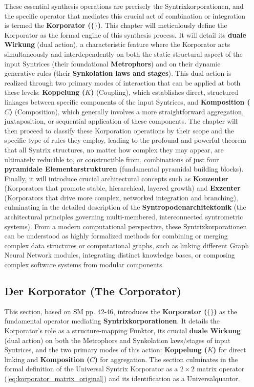 \documentclass[12pt]{article}
\begin{document}
These essential synthesis operations are precisely the Syntrixkorporationen, and the specific operator that mediates this crucial act of combination or integration is termed the \textbf{Korporator (\( \{ \} \))}. This chapter will meticulously define the Korporator as the formal engine of this synthesis process. It will detail its \textbf{duale Wirkung} (dual action), a characteristic feature where the Korporator acts simultaneously and interdependently on both the static structural aspect of the input Syntrices (their foundational \textbf{Metrophors}) and on their dynamic generative rules (their \textbf{Synkolation laws and stages}). This dual action is realized through two primary modes of interaction that can be applied at both these levels: \textbf{Koppelung (\( K \))} (Coupling), which establishes direct, structured linkages between specific components of the input Syntrices, and \textbf{Komposition (\( C \))} (Composition), which generally involves a more straightforward aggregation, juxtaposition, or sequential application of these components. The chapter will then proceed to classify these Korporation operations by their scope and the specific type of rules they employ, leading to the profound and powerful theorem that all Syntrix structures, no matter how complex they may appear, are ultimately reducible to, or constructible from, combinations of just four \textbf{pyramidale Elementarstrukturen} (fundamental pyramidal building blocks). Finally, it will introduce crucial architectural concepts such as \textbf{Konzenter} (Korporators that promote stable, hierarchical, layered growth) and \textbf{Exzenter} (Korporators that drive more complex, networked integration and branching), culminating in the detailed description of the \textbf{Syntropodenarchitektonik} (the architectural principles governing multi-membered, interconnected syntrometric systems). From a modern computational perspective, these Syntrixkorporationen can be understood as highly formalized methods for combining or merging complex data structures or computational graphs, such as linking different Graph Neural Network modules, integrating distinct knowledge bases, or composing complex software systems from modular components.

\subsection{Der Korporator (The Corporator)}
\label{sec:korporator}

This section, based on SM pp. 42-46, introduces the \textbf{Korporator (\( \{ \} \))} as the fundamental operator mediating \textbf{Syntrixkorporationen}. It details the Korporator's role as a structure-mapping Funktor, its crucial \textbf{duale Wirkung} (dual action) on both the Metrophors and Synkolation laws/stages of input Syntrices, and the two primary modes of this action: \textbf{Koppelung (\(K\))} for direct linking and \textbf{Komposition (\(C\))} for aggregation. The section culminates in the formal definition of the Universal Syntrix Korporator as a \(2 \times 2\) matrix operator (\eqref{eq:korporator_matrix_original}) and its identification as a Universalquantor.
\end{document}
